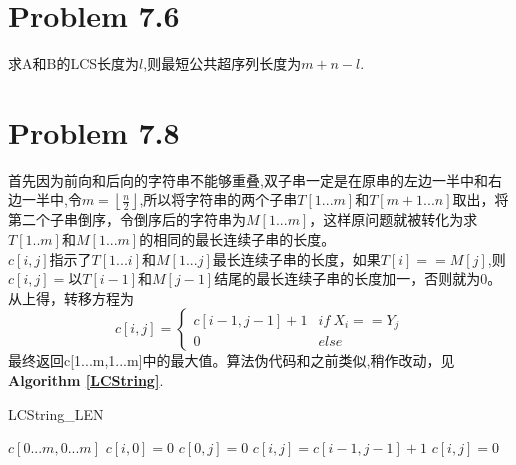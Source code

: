 \documentclass[onecolumn]{ctexart}
\begin{document}
\section*{Problem 7.6}
\indent 求A和B的LCS长度为$l$,则最短公共超序列长度为$m+n-l$.\\


\section*{Problem 7.8}
\indent 首先因为前向和后向的字符串不能够重叠,双子串一定是在原串的左边一半中和右边一半中,令$m=\left\lfloor\frac{n}{2}\right\rfloor$,所以将字符串的两个子串$T[1...m]$和$T[m+1...n]$取出，将第二个子串倒序，令倒序后的字符串为$M[1...m]$，这样原问题就被转化为求$T[1..m]$和$M[1...m]$的相同的最长连续子串的长度。\\
\indent $c[i,j]$指示了$T[1...i]$和$M[1...j]$最长连续子串的长度，如果$T[i]==M[j]$,则$c[i,j]=$以$T[i-1]$和$M
[j-1]$结尾的最长连续子串的长度加一，否则就为0。
\indent 从上得，转移方程为
\[
c[i,j]=
\begin{cases}
c[i-1,j-1]+1 &if\ X_i==Y_j\\
0 &else
\end{cases}
\] 
\indent 最终返回c[1...m,1...m]中的最大值。算法伪代码和之前类似,稍作改动，见\textbf{Algorithm \ref{LCString}}.\\
\begin{algorithm}[htbp]
	\caption{LCString\_LEN}
	\label{LCString}
	\begin{algorithmic}[1]
		\STATE $c[0...m,0...m]$
		\STATE $c[i,0]=0$
		\ENDFOR
		\STATE $c[0,j]=0$
		\ENDFOR	
			\STATE $c[i,j]=c[i-1,j-1]+1$
		\ELSE
			\STATE $c[i,j]=0$
		\ENDIF
		\ENDFOR
		\ENDFOR
	\end{algorithmic}
\end{algorithm}
\end{document}
